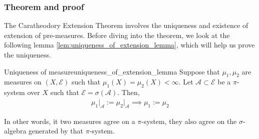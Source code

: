 \subsubsection{Theorem and proof}
The Caratheodory Extension Theorem involves the uniqueness and existence of extension of pre-measures. Before diving into the theorem, we look at the following lemma \ref{lem:uniqueness_of_extension_lemma}, which will help us prove the uniqueness.
\begin{proposition}{Uniqueness of measure}{uniqueness_of_extension_lemma}
    Suppose that $\mu_1, \mu_2$ are measures on $(X, \mathcal{E})$ such that $\mu_1(X)=\mu_2(X)<\infty$. Let $\mathcal{A}\subset\mathcal{E}$ be a $\pi$-system over $X$ such that $\mathcal{E}=\sigma(\mathcal{A})$. Then,
    \begin{align*}
        \mu_1\Big|_{\mathcal{A}} := \mu_2\Big|_{\mathcal{A}} \implies \mu_1 := \mu_2
    \end{align*}

    In other words, it two measures agree on a $\pi$-system, they also agree on the $\sigma$-algebra generated by that $\pi$-system.
\end{proposition}

